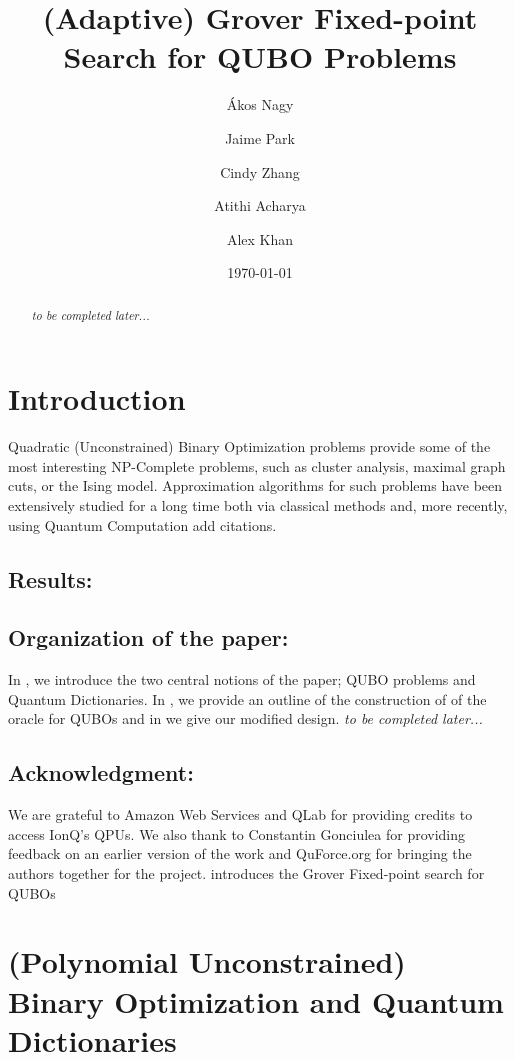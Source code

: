 \documentclass[reqno, 10pt]{amsart}
\title{(Adaptive) Grover Fixed-point Search for QUBO Problems}
\date{\today}
\author{\'Akos Nagy}
\author{Jaime Park}
\author{Cindy Zhang}
\author{Atithi Acharya}
\author{Alex Khan}
\numberwithin{equation}{section}                %
\begin{document}
\begin{abstract}
   \emph{to be completed later...}
\end{abstract}

\maketitle

\section{Introduction}

Quadratic (Unconstrained) Binary Optimization problems provide some of the most interesting NP-Complete problems, such as cluster analysis, maximal graph cuts, or the Ising model. Approximation algorithms for such problems have been extensively studied for a long time both via classical methods and, more recently, using Quantum Computation {\color{red} add citations}.

\medskip

\subsection{Results:}

\smallskip

\subsection*{Organization of the paper:} In , we introduce the two central notions of the paper; QUBO problems and Quantum Dictionaries. In , we provide an outline of the construction of \cite{gilliam_grover_2021} of the oracle for QUBOs and in  we give our modified design. \emph{to be completed later...}

\smallskip

\subsection*{Acknowledgment:} We are grateful to Amazon Web Services and QLab for providing credits to access IonQ's QPUs. We also thank to Constantin Gonciulea for providing feedback on an earlier version of the work and QuForce.org for bringing the authors together for the project.  introduces the Grover Fixed-point search for QUBOs

\bigskip

\section{(Polynomial Unconstrained) Binary Optimization and Quantum Dictionaries}
\label{sec:qubos_and_qdicts}
\end{document}
